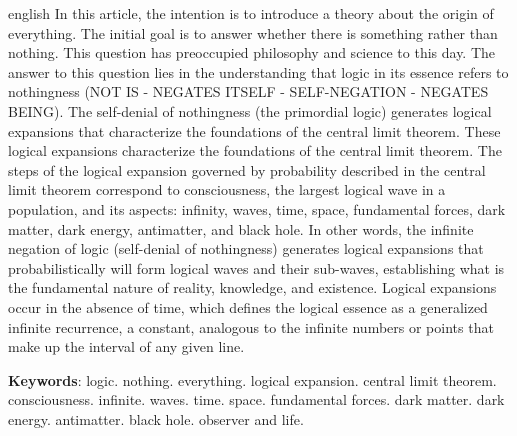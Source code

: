 \vspace{-5mm}
\renewcommand{\resumoname}{Abstract}
\begin{resumoumacoluna}
 \begin{otherlanguage*}{english}
	\vspace{-2mm}
		In this article, the intention is to introduce a theory about the origin of everything. The initial goal is to answer whether there is something rather than nothing. This question has preoccupied philosophy and science to this day. The answer to this question lies in the understanding that logic in its essence refers to nothingness (NOT IS - NEGATES ITSELF - SELF-NEGATION - NEGATES BEING). The self-denial of nothingness (the primordial logic) generates logical expansions that characterize the foundations of the central limit theorem. These logical expansions characterize the foundations of the central limit theorem.  The steps of the logical expansion governed by probability described in the central limit theorem correspond to consciousness, the largest logical wave in a population, and its aspects: infinity, waves, time, space, fundamental forces, dark matter, dark energy, antimatter, and black hole. In other words, the infinite negation of logic (self-denial of nothingness) generates logical expansions that probabilistically will form logical waves and their sub-waves, establishing what is the fundamental nature of reality, knowledge, and existence. Logical expansions occur in the absence of time, which defines the logical essence as a generalized infinite recurrence, a constant, analogous to the infinite numbers or points that make up the interval of any given line.
	\vspace{\onelineskip}  
	
	\noindent
	\textbf{Keywords}: logic. nothing. everything. logical expansion. central limit theorem. consciousness. infinite. waves. time. space. fundamental forces. dark matter. dark energy. antimatter. black hole. observer and life.
 \end{otherlanguage*}  
\end{resumoumacoluna}
